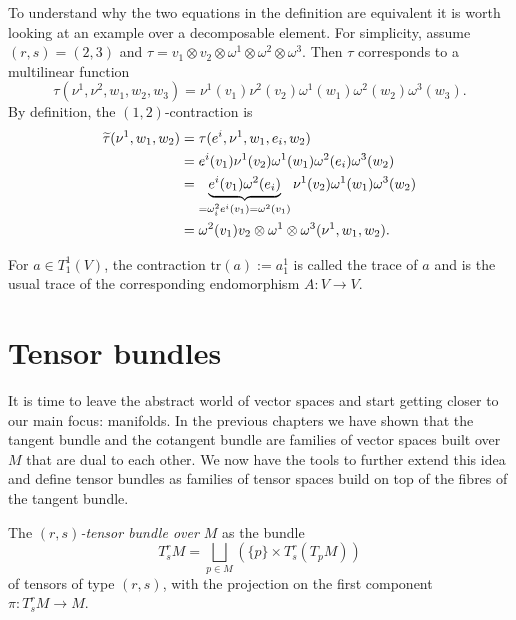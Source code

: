 \begin{example}
  To understand why the two equations in the definition are equivalent it is worth looking at an example over a decomposable element.
  For simplicity, assume $(r,s) = (2,3)$ and $\tau = v_1\otimes v_2\otimes\omega^1\otimes\omega^2\otimes\omega^3$.
  Then $\tau$ corresponds to a multilinear function
  \begin{equation}
    \tau(\nu^1,\nu^2,w_1,w_2,w_3) = \nu^1(v_1)\nu^2(v_2)\omega^1(w_1)\omega^2(w_2)\omega^3(w_3).
  \end{equation}
  By definition, the $(1,2)$-contraction is
  \begin{align}
    \widetilde\tau(\nu^1,w_1,w_2) &= \tau(e^i,\nu^1,w_1,e_i,w_2) \\
    &= e^i(v_1)\nu^1(v_2)\omega^1(w_1)\omega^2(e_i)\omega^3(w_2) \\
    &= \LaTeXunderbrace{e^i(v_1)\omega^2(e_i)}_{=\omega^2_i e^i (v_1) =\omega^2(v_1)}\nu^1(v_2)\omega^1(w_1)\omega^3(w_2) \\
    &= \omega^2(v_1) v_2\otimes\omega^1\otimes\omega^3 (\nu^1,w_1,w_2).
  \end{align}
\end{example}

\begin{example}
  For $a\in T_1^1(V)$, the contraction $\mathrm{tr} (a) := a^1_1$ is called the trace of $a$ and is the usual trace of the corresponding endomorphism $A:V\to V$.
\end{example}

\section{Tensor bundles}

It is time to leave the abstract world of vector spaces and start getting closer to our main focus: manifolds.
In the previous chapters we have shown that the tangent bundle and the cotangent bundle are families of vector spaces built over $M$ that are dual to each other.
We now have the tools to further extend this idea and define tensor bundles as families of tensor spaces build on top of the fibres of the tangent bundle.

\begin{definition}
  The \emph{$(r,s)$-tensor bundle over $M$} as the bundle
  \begin{equation}
    T_s^r M = \bigsqcup_{p\in M}\left(\{p\}\times T_s^r(T_p M)\right)
  \end{equation}
  of tensors of type $(r,s)$, with the projection on the first component $\pi:T_s^r M\to M$.
\end{definition}

